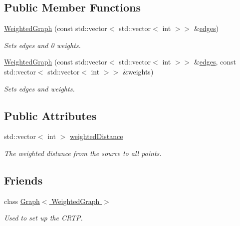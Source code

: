 \subsection*{Public Member Functions}
\begin{DoxyCompactItemize}
\item 
\hyperlink{classMackey_1_1WeightedGraph_a7d1167cb1c379843cd2845757037d217}{Weighted\+Graph} (const std\+::vector$<$ std\+::vector$<$ int $>$$>$ \&\hyperlink{classMackey_1_1Graph_a0a2aeb9b16c5f0e583f360943b7f340f}{edges})
\begin{DoxyCompactList}\small\item\em Sets edges and 0 weights. \end{DoxyCompactList}\item 
\hyperlink{classMackey_1_1WeightedGraph_a5949ba99b50db23d59c124a4ff9a3072}{Weighted\+Graph} (const std\+::vector$<$ std\+::vector$<$ int $>$$>$ \&\hyperlink{classMackey_1_1Graph_a0a2aeb9b16c5f0e583f360943b7f340f}{edges}, const std\+::vector$<$ std\+::vector$<$ int $>$$>$ \&weights)
\begin{DoxyCompactList}\small\item\em Sets edges and weights. \end{DoxyCompactList}\end{DoxyCompactItemize}
\subsection*{Public Attributes}
\begin{DoxyCompactItemize}
\item 
std\+::vector$<$ int $>$ \hyperlink{classMackey_1_1WeightedGraph_a72a46f1710e7783a4b0ac64468036a90}{weighted\+Distance}
\begin{DoxyCompactList}\small\item\em The weighted distance from the source to all points. \end{DoxyCompactList}\end{DoxyCompactItemize}
\subsection*{Friends}
\begin{DoxyCompactItemize}
\item 
class \hyperlink{classMackey_1_1WeightedGraph_aa4863e14b8d7dcd76942894cae55e453}{Graph$<$ Weighted\+Graph $>$}
\begin{DoxyCompactList}\small\item\em Used to set up the C\+R\+TP. \end{DoxyCompactList}\end{DoxyCompactItemize}
